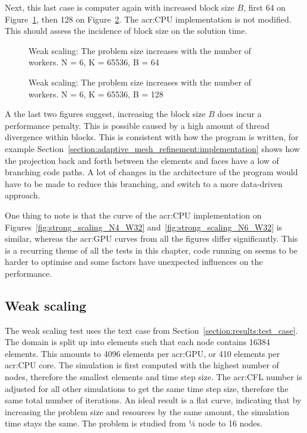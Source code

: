 Next, this last case is computer again with increased block size \(B\), first 64 on
Figure~\ref{fig:strong_scaling_N6_W64}, then 128 on Figure~\ref{fig:strong_scaling_N6_W128}. The
\acrshort{acr:CPU} implementation is not modified. This should assess the incidence of block size on
the solution time.

\begin{figure}[H]
	\centering
	
	\caption{Weak scaling: The problem size increases with the number of workers. N = 6, K = 65536, B = 64}\label{fig:strong_scaling_N6_W64}
\end{figure}

\begin{figure}[H]
	\centering
	
	\caption{Weak scaling: The problem size increases with the number of workers. N = 6, K = 65536, B = 128}\label{fig:strong_scaling_N6_W128}
\end{figure}

A the last two figures suggest, increasing the block size \(B\) does incur a performance penalty.
This is possible caused by a high amount of thread divergence within blocks. This is consistent with
how the program is written, for example
Section~\ref{section:adaptive_mesh_refinement:implementation} shows how the projection back and
forth between the elements and faces have a low of branching code paths. A lot of changes in the
architecture of the program would have to be made to reduce this branching, and switch to a more
data-driven approach.

One thing to note is that the curve of the \acrshort{acr:CPU} implementation on
Figures~\ref{fig:strong_scaling_N4_W32} and~\ref{fig:strong_scaling_N6_W32} is similar, whereas the
\acrshort{acr:GPU} curves from all the figures differ significantly. This is a recurring theme of
all the tests in this chapter, code running on  seems to be harder to optimise
and some factors have unexpected influences on the performance.

\subsection{Weak scaling}\label{subsection:results:scaling_tests:weak}

The weak scaling test uses the text case from Section~\ref{section:results:test_case}. The domain is
split up into elements such that each node contains 16384 elements. This amounts to 4096 elements
per \acrshort{acr:GPU}, or 410 elements per \acrshort{acr:CPU} core. The simulation is first
computed with the highest number of nodes, therefore the smallest elements and time step size. The
\acrshort{acr:CFL} number is adjusted for all other simulations to get the same time step size,
therefore the same total number of iterations. An ideal result is a flat curve, indicating that by
increasing the problem size and resources by the same amount, the simulation time stays the same.
The problem is studied from ¼ node to 16 nodes.

